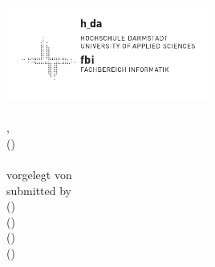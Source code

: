 \begin{titlingpage}
	\vspace*{0cm}
	\sffamily 
	\begin{centering}
		\includegraphics[width=0.5\textwidth]{images/fbi_logo.pdf} \\
		\vspace{2.5cm}
		\Huge
			\textbf{\docType} \\
		\vspace{1cm}
		\normalsize
			\docCourse, \docCourseSemester \\
		\small
			(\textit{\docCourseProf}) \\
		\vspace{3cm}
		\LARGE
			\docTypeRubric \\
		\vspace{4cm}
		\normalsize
			\ifde
				vorgelegt von\\
			\else
				submitted by\\
			\fi
		\vspace{1cm}	
		\large
			\docStudentA \hspace{0.1cm} (\docStudentAMatrikel)\\
			\vspace{0.2cm}
			\docStudentB \hspace{0.1cm} (\docStudentBMatrikel)\\
			\vspace{0.2cm}
			\docStudentC \hspace{0.1cm} (\docStudentCMatrikel)\\
			\vspace{0.2cm}
			\docStudentD \hspace{0.1cm} (\docStudentDMatrikel)\\
			\vspace{1cm}
		\normalsize
			\docDate \\
	\end{centering}
	
\end{titlingpage}

